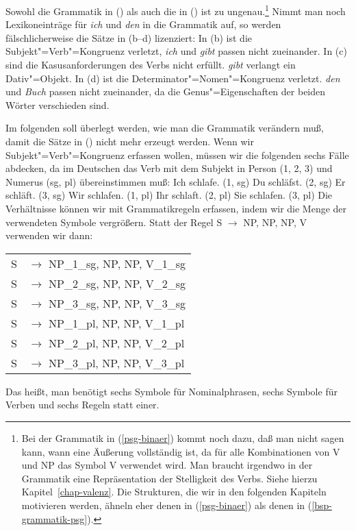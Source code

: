\noindent
Sowohl die Grammatik in () als auch die in () ist zu ungenau.\footnote{
  Bei der Grammatik in (\ref{psg-binaer}) kommt noch dazu, daß man nicht sagen kann,
  wann eine Äußerung vollständig ist, da für alle Kombinationen von V und NP das Symbol
  V verwendet wird. Man braucht irgendwo in der Grammatik eine Repräsentation der Stelligkeit
  des Verbs. Siehe hierzu Kapitel~\ref{chap-valenz}. Die Strukturen, die wir in den folgenden
  Kapiteln motivieren werden, ähneln eher denen in (\ref{psg-binaer}) als denen in (\ref{bsp-grammatik-psg}).%
}
Nimmt man noch Lexikoneinträge für \emph{ich} und \emph{den} in die Grammatik auf, so werden
fälschlicherweise die Sätze in (b--d) lizenziert:
\eal
{}
\zl
In (b) ist die Subjekt"=Verb"=Kongruenz verletzt, {\em ich\/} und {\em gibt\/} passen
nicht zueinander. In (c) sind die Kasusanforderungen des Verbs nicht erfüllt.
{\em gibt\/} verlangt ein Dativ"=Objekt. In (d) ist die Determinator"=Nomen"=Kongruenz
verletzt. {\em den\/} und {\em Buch\/} passen nicht zueinander, da die Genus"=Eigenschaften der
beiden Wörter verschieden sind.

Im folgenden soll überlegt werden, wie man die Grammatik verändern muß, damit die Sätze in ()
nicht mehr erzeugt werden. Wenn wir Subjekt"=Verb"=Kongruenz erfassen wollen, müssen
wir die folgenden sechs Fälle abdecken, da im Deutschen das Verb mit dem Subjekt in Person (1, 2, 3)
und Numerus (sg, pl) übereinstimmen muß:
\eal\jamwidth=8cm\relax
\ex Ich schlafe.  \jam(1, sg)
\ex Du schläfst.  \jam(2, sg)
\ex Er schläft.   \jam(3, sg)
\ex Wir schlafen. \jam(1, pl)
\ex Ihr schlaft.  \jam(2, pl)
\ex Sie schlafen. \jam(3, pl)
\zl
Die Verhältnisse können wir mit Grammatikregeln erfassen, indem wir die Menge der verwendeten
Symbole vergrößern. Statt der Regel S $\to$ NP, NP, NP, V verwenden wir dann:
\ea
\begin{tabular}[t]{@{}l@{ }l}
S  & $\to$ NP\_1\_sg, NP, NP, V\_1\_sg\\
S  & $\to$ NP\_2\_sg, NP, NP, V\_2\_sg\\
S  & $\to$ NP\_3\_sg, NP, NP, V\_3\_sg\\
S  & $\to$ NP\_1\_pl, NP, NP, V\_1\_pl\\
S  & $\to$ NP\_2\_pl, NP, NP, V\_2\_pl\\
S  & $\to$ NP\_3\_pl, NP, NP, V\_3\_pl\\
\end{tabular}
\z
Das heißt, man benötigt sechs Symbole für Nominalphrasen, sechs Symbole für Verben und 
sechs Regeln statt einer.

